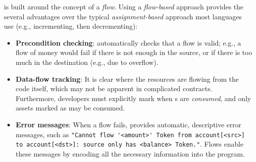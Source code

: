 \documentclass[nonacm, dvipsnames, usenames, sigconf]{acmart}
\begin{document}
\langName is built around the concept of a \emph{flow}. %
Using  a \emph{flow-based} approach provides the several advantages over the typical \emph{assignment-based} approach most languages use (e.g., incrementing, then decrementing):
\begin{itemize}
    \item \textbf{Precondition checking}: \langName automatically checks that a flow is valid; e.g., a flow of money would fail if there is not enough in the source, or if there is too much in the destination (e.g., due to overflow).
    \item \textbf{Data-flow tracking}: It is clear where the resources are flowing from the code itself, which may not be apparent in complicated contracts. %
        Furthermore, developers must explicitly mark when \assetTxt{}s are \emph{consumed}, and only assets marked as  may be consumed.
    \item \textbf{Error messages}: When a flow fails, \langName provides automatic, descriptive error messages, such as \lstinline{"Cannot flow '<amount>' Token from account[<src>] to account[<dst>]: source only has <balance> Token."}.
        Flows enable these messages by encoding all the necessary information into the program.%
\end{itemize}
\end{document}

